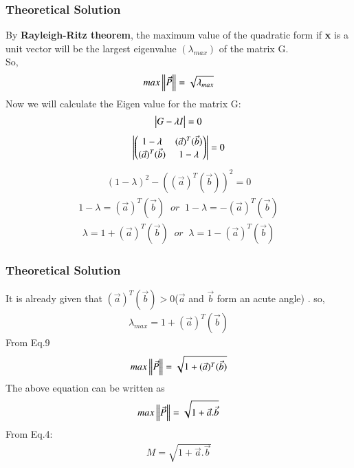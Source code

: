 \documentclass{beamer}
\begin{document}
\begin{frame}
\frametitle{Theoretical Solution}
    By \textbf{Rayleigh-Ritz theorem}, the maximum value of the quadratic form if \textbf{x} is a unit vector will be the largest eigenvalue $(\lambda_{max})$ of the matrix G.\\
So,
\begin{align}
    max\left\lVert\Vec{P}\right\rVert=\sqrt{\lambda_{max}}
\end{align}
Now we will calculate the Eigen value for the matrix G:
\begin{align}
    \begin{vmatrix}G-\lambda I\end{vmatrix}=0
\end{align}
\begin{align}
    \begin{vmatrix}\begin{pmatrix}1-\lambda&(\Vec{a})^T(\Vec{b})\\(\Vec{a})^T(\Vec{b})&1-\lambda\end{pmatrix}\end{vmatrix}=0
\end{align}
\begin{align}
    (1-\lambda)^2-((\Vec{a})^T(\Vec{b}))^2=0
\end{align}
\begin{align}
    1-\lambda=(\Vec{a})^T(\Vec{b})\;\;or\;\;1-\lambda=-(\Vec{a})^T(\Vec{b})
\end{align}
\begin{align}
    \lambda=1+(\Vec{a})^T(\Vec{b})\;\;or \;\;\lambda=1-(\Vec{a})^T(\Vec{b})
\end{align}


\end{frame}
\begin{frame}
\frametitle{Theoretical Solution}
  It is already given that $(\Vec{a})^T(\Vec{b})>0 $($\Vec{a}$ and $\Vec{b}$ form an acute angle) . so,
\begin{align}
 \lambda_{max}=1+  (\Vec{a})^T(\Vec{b}) 
\end{align}
From Eq.9
\begin{align}
    max\left\lVert\Vec{P}\right\rVert=\sqrt{1+  (\Vec{a})^T(\Vec{b}) }
\end{align}
The above equation can be written as
\begin{align}
   max \left\lVert\Vec{P}\right\rVert=\sqrt{1+\Vec{a}.\Vec{b}}
\end{align}
From Eq.4:
\begin{align}
    M=\sqrt{1+\Vec{a}.\Vec{b}}
\end{align}


\end{frame}
\end{document}
